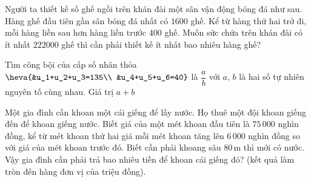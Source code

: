 \begin{ex}%
	Người ta thiết kế số ghế ngồi trên khán đài một sân vận động bóng đá như sau. Hàng ghế đầu tiên gần sân bóng đá nhất có $1600$ ghế. Kể từ hàng thứ hai trở đi, mỗi hàng liền sau hơn hàng liền trước 400 ghế. Muốn sức chứa trên khán đài có ít nhất $222000$ ghế thì cần phải thiết kế ít nhất bao nhiêu hàng ghế?
\end{ex}

\begin{ex}%
	Tìm công bội của cấp số nhân thỏa $\heva{&u_1+u_2+u_3=135\\	&u_4+u_5+u_6=40}$ là $\dfrac{a}{b}$ với $a$, $b$ là hai số tự nhiên nguyên tố cùng nhau. Giá trị $a+b$
\end{ex}

\begin{ex}%
Một gia đình cần khoan một cái giếng để lấy nước. Họ thuê một đội khoan giếng đến để khoan giếng nước. Biết giá của một mét khoan đầu tiên là $75\,000$ nghìn đồng, kể từ mét khoan thứ hai giá mỗi mét khoan tăng lên $6\,000$ nghìn đồng so với giá của mét khoan trước đó. Biết cần phải khoang sâu $80\mathrm{\,m}$ thì mới có nước. Vậy gia đình cần phải trả bao nhiêu tiền để khoan cái giếng đó? (kết quả làm tròn đến hàng đơn vị của triệu đồng).
\end{ex}

